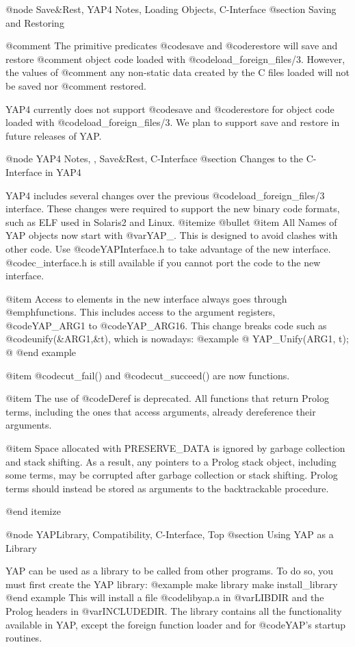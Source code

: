 @node Save&Rest, YAP4 Notes, Loading Objects, C-Interface
@section Saving and Restoring

@comment The primitive predicates @code{save} and @code{restore} will save and restore
@comment object code loaded with @code{load_foreign_files/3}. However, the values of
@comment any non-static data created by the C files loaded will not be saved nor
@comment restored.

YAP4 currently does not support @code{save} and @code{restore} for object code
loaded with @code{load_foreign_files/3}. We plan to support save and restore
in future releases of YAP.

@node YAP4 Notes, , Save&Rest, C-Interface
@section Changes to the C-Interface in YAP4

YAP4 includes several changes over the previous @code{load_foreign_files/3}
interface. These changes were required to support the new binary code
formats, such as ELF used in Solaris2 and Linux.
@itemize @bullet
@item All Names of YAP objects now start with @var{YAP_}. This is
designed to avoid clashes with other code. Use @code{YAPInterface.h} to
take advantage of the new interface. @code{c_interface.h} is still
available if you cannot port the code to the new interface.

@item Access to elements in the new interface always goes through
@emph{functions}. This includes access to the argument registers,
@code{YAP_ARG1} to @code{YAP_ARG16}. This change breaks code such as
@code{unify(&ARG1,&t)}, which is nowadays:
@example
@{
   YAP_Unify(ARG1, t);
@}
@end example

@item @code{cut_fail()} and @code{cut_succeed()} are now functions.

@item The use of @code{Deref} is deprecated. All functions that return
Prolog terms, including the ones that access arguments, already
dereference their arguments.

@item Space allocated with PRESERVE_DATA is ignored by garbage
collection and stack shifting. As a result, any pointers to a Prolog
stack object, including some terms, may be corrupted after garbage
collection or stack shifting. Prolog terms should instead be stored as
arguments to the backtrackable procedure.

@end itemize

@node YAPLibrary, Compatibility, C-Interface, Top
@section Using YAP as a Library

YAP can be used as a library to be called from other
programs. To do so, you must first create the YAP library:
@example
make library
make install_library
@end example
This will install a file @code{libyap.a} in @var{LIBDIR} and the Prolog
headers in @var{INCLUDEDIR}. The library contains all the functionality
available in YAP, except the foreign function loader and for
@code{YAP}'s startup routines.

